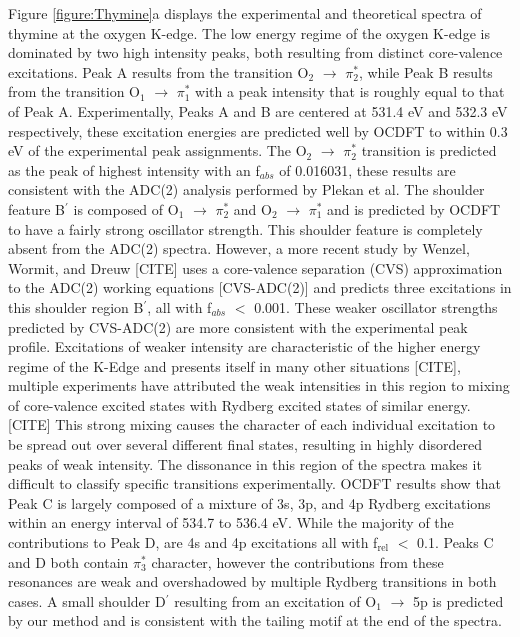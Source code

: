 \documentclass[12pt]{article}
\begin{document}
Figure \ref{figure:Thymine}a displays the experimental and theoretical spectra of thymine at the oxygen K-edge. The low energy regime of the oxygen K-edge is dominated by two high intensity peaks, both resulting from distinct core-valence excitations. Peak A results from the transition O$_2$ $\rightarrow$ $\pi^*_2$, while Peak B results from the transition O$_1$ $\rightarrow$ $\pi^*_1$ with a peak intensity that is roughly equal to that of Peak A. Experimentally, Peaks A and B are centered at 531.4 eV and 532.3 eV respectively, these excitation energies are predicted well by OCDFT to within 0.3 eV of the experimental peak assignments. The  O$_2$ $\rightarrow$ $\pi_2^*$ transition is predicted as the peak of highest intensity with an f$_{abs}$ of 0.016031, these results are consistent with the ADC(2) analysis performed by Plekan et al. The shoulder feature B$^{\prime}$ is composed of O$_1$ $\rightarrow$ $\pi^*_2$ and O$_2$ $\rightarrow$ $\pi^*_1$ and is predicted by OCDFT to have a fairly strong oscillator strength. This shoulder feature is completely absent from the ADC(2) spectra. However, a more recent study by Wenzel, Wormit, and Dreuw [CITE] uses a core-valence separation (CVS) approximation to the ADC(2) working equations [CVS-ADC(2)] and predicts three excitations in this shoulder region B$^{\prime}$, all with f$_{abs}$ $<$ 0.001. These weaker oscillator strengths predicted by CVS-ADC(2) are more consistent with the experimental peak profile. Excitations of weaker intensity are characteristic of the higher energy regime of the K-Edge and presents itself in many other situations [CITE], multiple experiments have attributed the weak intensities in this region to mixing of core-valence excited states with Rydberg excited states of similar energy.[CITE] This strong mixing causes the character of each individual excitation to be spread out over several different final states, resulting in highly disordered peaks of weak intensity. The dissonance in this region of the spectra makes it difficult to classify specific transitions experimentally. OCDFT results show that Peak C is largely composed of a mixture of 3s, 3p, and 4p Rydberg excitations within an energy interval of 534.7 to 536.4 eV. While the majority of the contributions to Peak D, are 4s and 4p excitations all with f$_{\text{rel}}$ $<$ 0.1. Peaks C and D both contain $\pi^*_3$ character, however the contributions from these resonances are weak and overshadowed by multiple Rydberg transitions in both cases. A small shoulder D$^{\prime}$ resulting from an excitation of O$_1$ $\rightarrow$ 5p is predicted by our method and is consistent with the tailing motif at the end of the spectra. \\
\end{document}
